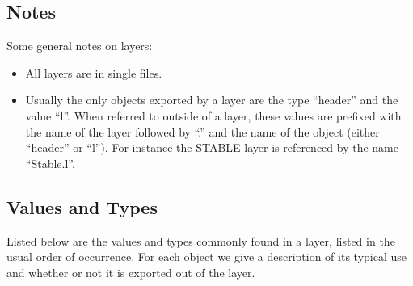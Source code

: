 
\subsection{Notes}

Some general notes on layers:
\begin{itemize}
\item
All layers are in single files.
\item
Usually the only objects exported by a layer are the type ``header'' and
the value ``l''.  When referred to outside of a layer, these values are
prefixed with the name of the layer followed by ``.''  and the name of
the object (either ``header'' or ``l'').  For instance the STABLE layer is
referenced by the name ``Stable.l''.
\end{itemize}


\subsection{Values and Types}
Listed below are the values and types commonly found in a layer, listed in
the usual order of occurrence.  For each object we give a description of
its typical use and whether or not it is exported out of the layer.

